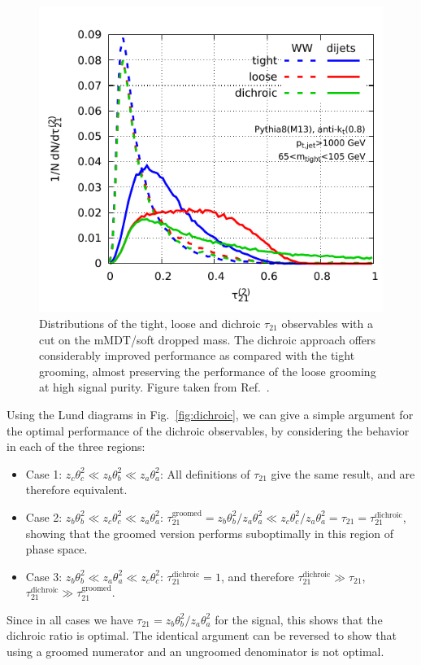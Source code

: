 \documentclass[11pt,letterpaper]{article}
\newcommand{\dichroic}{\text{dichroic}}
\newcommand{\groomed}{\text{groomed}}
\DeclareRobustCommand{\Fig}[1]{Fig.~\ref{#1}}
\DeclareRobustCommand{\Ref}[1]{Ref.~\cite{#1}}
\begin{document}
\begin{figure}[t]
\begin{center}
\includegraphics[width=0.5\columnwidth]{figures/dichroic-illust}
\end{center}
\caption{Distributions of the tight, loose and dichroic $\tau_{21}$ observables with a cut on the mMDT/soft dropped mass. The dichroic approach offers considerably improved performance as compared with the tight grooming, almost preserving the performance of the loose grooming at high signal purity. Figure taken from \Ref{Salam:2016yht}.}
\label{fig:dichroic_distribution}
\end{figure}

Using the Lund diagrams in \Fig{fig:dichroic}, we can give a simple argument for the optimal performance of the dichroic observables, by considering the behavior in each of the three regions:
\begin{itemize}
\item Case 1: $z_c \theta_c^2 \ll z_b \theta_b^2 \ll z_a \theta_a^2$: All definitions of $\tau_{21}$ give the same result, and are therefore equivalent.
\item Case 2: $z_b\theta_b^2 \ll z_c \theta_c^2 \ll z_a \theta_a^2$: $\tau_{21}^\groomed=z_b \theta_b^2/z_a \theta_a^2 \ll  z_c \theta_c^2/z_a \theta_a^2=\tau_{21}=\tau_{21}^\dichroic$, showing that the groomed version performs suboptimally in this region of phase space.
\item Case 3: $z_b \theta_b^2 \ll z_a \theta_a^2 \ll z_c \theta_c^2$: $\tau_{21}^\dichroic=1$, and therefore $\tau_{21}^\dichroic \gg \tau_{21}$, $\tau_{21}^\dichroic \gg \tau_{21}^\groomed$. 
\end{itemize}
Since in all cases we have $\tau_{21}=z_b\theta_b^2/z_a\theta_a^2$ for
the signal, this shows that the dichroic
ratio is optimal.
%
The identical argument can be reversed to show that
using a groomed numerator and an ungroomed denominator is not optimal.
\end{document}
